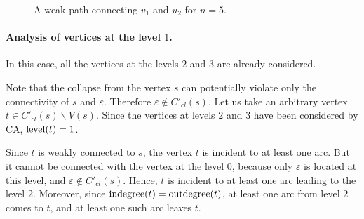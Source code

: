 \begin{figure}[ht]
\begin{center}

\end{center}

\caption{A weak path connecting $v_1$ and $u_2$ for $n=5$.}\label{fig:lvl2n5pathvu}
\end{figure}

\paragraph{Analysis of vertices at the level \texorpdfstring{$1$}{1}.}

In this case, all the vertices at the levels $ 2 $ and $ 3 $ are already considered.

Note that the collapse from the vertex $ s $ can potentially violate only the connectivity of $ s $ and $ \varepsilon $. Therefore $ \varepsilon \notin C'_{cl} (s) $. Let us take an arbitrary vertex $ t \in C'_{cl}(s) \backslash V(s)$. Since the vertices at levels $2$ and $3$ have been considered by CA, $ \operatorname{level} (t) = 1 $.

Since $t$ is weakly connected to $s$, the vertex $ t $ is incident to at least one arc. But it cannot be connected with the vertex at the level $ 0 $, because only $ \varepsilon $ is located at this level, and $ \varepsilon \notin C'_{cl} (s) $. Hence, $ t $ is incident to at least one arc leading to the level $ 2 $. Moreover, since $ \operatorname{indegree}(t)=\operatorname{outdegree}(t)$, at least one arc from level $2$ comes to $ t $, and at least one such arc leaves $ t $.

